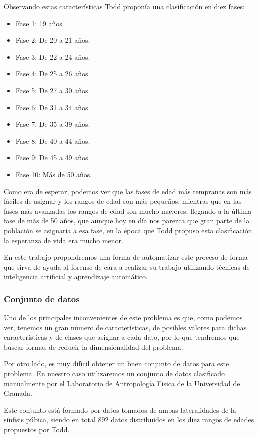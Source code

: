 Observando estas características Todd proponía una clasificación en diez fases:

\begin{itemize}
	\item Fase 1: 19 años.
	\item Fase 2: De 20 a 21 años.
	\item Fase 3: De 22 a 24 años.
	\item Fase 4: De 25 a 26 años.
	\item Fase 5: De 27 a 30 años.
	\item Fase 6: De 31 a 34 años.
	\item Fase 7: De 35 a 39 años.
	\item Fase 8: De 40 a 44 años.
	\item Fase 9: De 45 a 49 años.
	\item Fase 10: Más de 50 años.
\end{itemize}

Como era de esperar, podemos ver que las fases de edad más tempranas son más fáciles de asignar y los rangos de edad son más pequeños, mientras que en las fases más avanzadas los rangos de edad son mucho mayores, llegando a la última fase de más de 50 años, que aunque hoy en día nos parezca que gran parte de la población se asignaría a esa fase, en la época que Todd propuso esta clasificación la esperanza de vida era mucho menor.

En este trabajo propondremos una forma de automatizar este proceso de forma que sirva de ayuda al forense de cara a realizar su trabajo utilizando técnicas de inteligencia artificial y aprendizaje automático.

\subsubsection{Conjunto de datos}

Uno de los principales inconvenientes de este problema es que, como podemos ver, tenemos un gran número de características, de posibles valores para dichas características y de clases que asignar a cada dato, por lo que tendremos que buscar formas de reducir la dimensionalidad del problema.

Por otro lado, es muy difícil obtener un buen conjunto de datos para este problema. En nuestro caso utilizaremos un conjunto de datos clasificado manualmente por el Laboratorio de Antropología Física de la Universidad de Granada\cite{laboratorioForenseUGR}.

Este conjunto está formado por datos tomados de ambas lateralidades de la sínfisis púbica, siendo en total 892 datos distribuidos en los diez rangos de edades propuestos por Todd.

